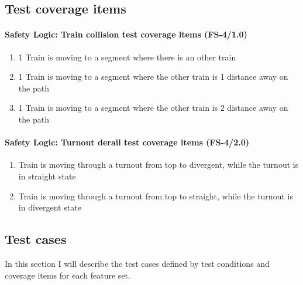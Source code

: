 \subsection{Test coverage items}

\paragraph{Safety Logic: Train collision test coverage items (FS-4/1.0)}
\begin{enumerate}[label=FS-5/1.0-\arabic*, leftmargin=*, format=\small]
	\item 1 Train is moving to a segment where there is an other train
	\item 1 Train is moving to a segment where the other train is 1 distance away on the path
	\item 1 Train is moving to a segment where the other train is 2 distance away on the path
\end{enumerate}
\paragraph{Safety Logic: Turnout derail test coverage items (FS-4/2.0)}
\begin{enumerate}[label=FS-5/2.0-\arabic*, leftmargin=*, format=\small]
	\item Train is moving through a turnout from top to divergent, while the turnout is in straight state
	\item Train is moving through a turnout from top to straight, while the turnout is in divergent state
\end{enumerate}

\subsection{Test cases}\label{section:UnitTestCases}
In this section I will describe the test cases defined by test conditions and coverage items for each feature set.
